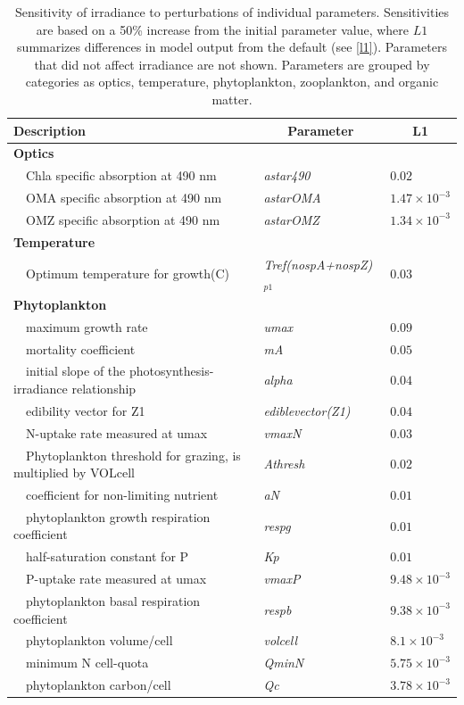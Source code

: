 \documentclass[preprint]{elsarticle}\usepackage[]{graphicx}\usepackage[]{color}
\begin{document}
\begin{table}[!tbp]
{\footnotesize
\caption{Sensitivity of irradiance to perturbations of individual parameters.  Sensitivities are based on a 50\% increase from the initial parameter value, where $L1$ summarizes differences in model output from the default (see \cref{l1}).  Parameters that did not affect irradiance are not shown.  Parameters are grouped by categories as optics, temperature, phytoplankton, zooplankton, and organic matter.\label{tab:irrsens}} 
\begin{center}
\begin{tabular}{lll}
\hline\hline
\multicolumn{1}{l}{Description}&\multicolumn{1}{c}{Parameter}&\multicolumn{1}{c}{L1}\tabularnewline
\hline
{\bfseries Optics}&&\tabularnewline
~~Chla specific absorption at 490 nm&\textit{astar490}&$0.02$\tabularnewline
~~OMA specific absorption at 490 nm&\textit{astarOMA}&$1.47\times 10^{-3}$\tabularnewline
~~OMZ specific absorption at 490 nm&\textit{astarOMZ}&$1.34\times 10^{-3}$\tabularnewline
\hline
{\bfseries Temperature}&&\tabularnewline
~~Optimum temperature for growth(C)&\textit{Tref(nospA+nospZ)$_{p1}$}&$0.03$\tabularnewline
\hline
{\bfseries Phytoplankton}&&\tabularnewline
~~maximum growth rate&\textit{umax}&$0.09$\tabularnewline
~~mortality coefficient&\textit{mA}&$0.05$\tabularnewline
~~initial slope of the photosynthesis-irradiance relationship&\textit{alpha}&$0.04$\tabularnewline
~~edibility vector for Z1&\textit{ediblevector(Z1)}&$0.04$\tabularnewline
~~N-uptake rate measured at umax&\textit{vmaxN}&$0.03$\tabularnewline
~~Phytoplankton threshold for grazing, is multiplied by VOLcell&\textit{Athresh}&$0.02$\tabularnewline
~~coefficient for non-limiting nutrient&\textit{aN}&$0.01$\tabularnewline
~~phytoplankton growth respiration coefficient&\textit{respg}&$0.01$\tabularnewline
~~half-saturation constant for P&\textit{Kp}&$0.01$\tabularnewline
~~P-uptake rate measured at umax&\textit{vmaxP}&$9.48\times 10^{-3}$\tabularnewline
~~phytoplankton basal respiration coefficient&\textit{respb}&$9.38\times 10^{-3}$\tabularnewline
~~phytoplankton volume/cell&\textit{volcell}&$8.1\times 10^{-3}$\tabularnewline
~~minimum N cell-quota&\textit{QminN}&$5.75\times 10^{-3}$\tabularnewline
~~phytoplankton carbon/cell&\textit{Qc}&$3.78\times 10^{-3}$\tabularnewline

\end{tabular}
\end{center}}
\end{table}
\end{document}
